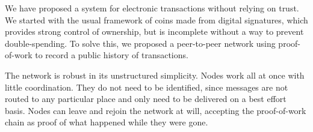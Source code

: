 \documentclass{article}
\begin{document}
We have proposed a system for electronic transactions without relying on trust. We started with the usual framework of coins made from digital signatures, which provides strong control of ownership, but is incomplete without a way to prevent double-spending. To solve this, we proposed a peer-to-peer network using proof-of-work to record a public history of transactions.

The network is robust in its unstructured simplicity. Nodes work all at once with little coordination. They do not need to be identified, since messages are not routed to any particular place and only need to be delivered on a best effort basis. Nodes can leave and rejoin the network at will, accepting the proof-of-work chain as proof of what happened while they were gone.
\end{document}
